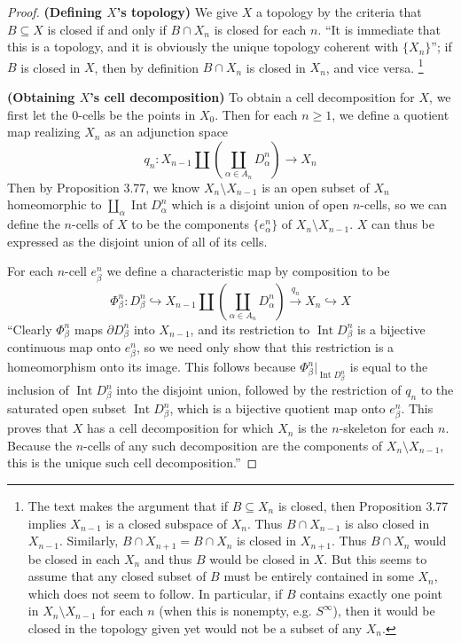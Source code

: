 \documentclass{article}
\theoremstyle{definition}
\newcommand{\p}[1]{\left(#1\right)}
\begin{document}
\begin{proof}
\textbf{(Defining $X$'s topology)}
We give $X$ a topology by the criteria that $B \subseteq X$ is closed if and only if
$B \cap X_n$ is closed for each $n$. ``It is immediate that this is a topology, and it is
obviously the unique topology coherent with $\{X_n\}$''; if $B$ is closed in $X$, then
by definition $B \cap X_n$ is closed in $X_n$, and vice versa.%
\footnote{The text makes the argument
that if $B \subseteq X_n$ is closed, then Proposition 3.77 implies $X_{n-1}$ is a closed
subspace of $X_n$. Thus $B \cap X_{n-1}$ is also closed in $X_{n-1}$. 
Similarly, $B \cap X_{n+1} = B \cap X_n$ is closed in $X_{n+1}$. Thus $B\cap X_n$ would
be closed in each $X_n$ and thus $B$ would be closed in $X$. But this seems to assume that
any closed subset of $B$ must be entirely contained in some $X_n$, which does not seem to
follow. In particular, if $B$ contains exactly one point in $X_n \setminus X_{n-1}$ for 
each $n$ (when this is nonempty, e.g. $S^\infty$), 
then it would be closed in the topology given yet would not be a subset of 
any $X_n$.}

\textbf{(Obtaining $X$'s cell decomposition)}
To obtain a cell decomposition for $X$, we first let the $0$-cells be the points in
$X_0$. Then for each $n \ge 1$, we define a quotient map realizing $X_n$ as an adjunction
space 
\[
q_n : X_{n-1} \amalg \p{ \coprod_{\alpha \in A_n} D_\alpha^n} \to X_n
\]
Then by Proposition 3.77, we know $X_n \setminus X_{n-1}$ is an open subset of $X_n$
homeomorphic to $\coprod_{\alpha} \operatorname{Int} D_\alpha^n$ which is a disjoint
union of open $n$-cells, so we can define the $n$-cells of $X$ to be the components
$\{ e_\alpha^n \}$
of $X_n \setminus X_{n-1}$. $X$ can thus be expressed as the disjoint union of all of
its cells.

For each $n$-cell $e_\beta^n$ we define a characteristic map by composition to be
\[
\Phi_\beta^n 
: D_\beta^n 
\hookrightarrow X_{n-1} \amalg \p{ \coprod_{\alpha\in A_n} D_\alpha^n }
\overset{q_n}{\to} X_n
\hookrightarrow X
\]
``Clearly $\Phi_\beta^n$ maps $\partial D_\beta^n$ into $X_{n-1}$, and its restriction to 
$\operatorname{Int} D_\beta^n$ is a bijective continuous map onto $e_\beta^n$,
so we need only show that this restriction is a homeomorphism onto its image.
This follows because $\Phi_\beta^n|_{\operatorname{Int} D_\beta^n}$ is equal to
the inclusion of $\operatorname{Int} D_\beta^n$ into the disjoint union, followed by the 
restriction of $q_n$ to the saturated open subset $\operatorname{Int} D_\beta^n$,
which is a bijective quotient map onto $e_\beta^n$. This proves that $X$ has a cell 
decomposition for which $X_n$ is the $n$-skeleton for each $n$. Because the $n$-cells
of any such decomposition are the components of $X_n \setminus X_{n-1}$, this is the unique
such cell decomposition.''


\end{proof}
\end{document}
